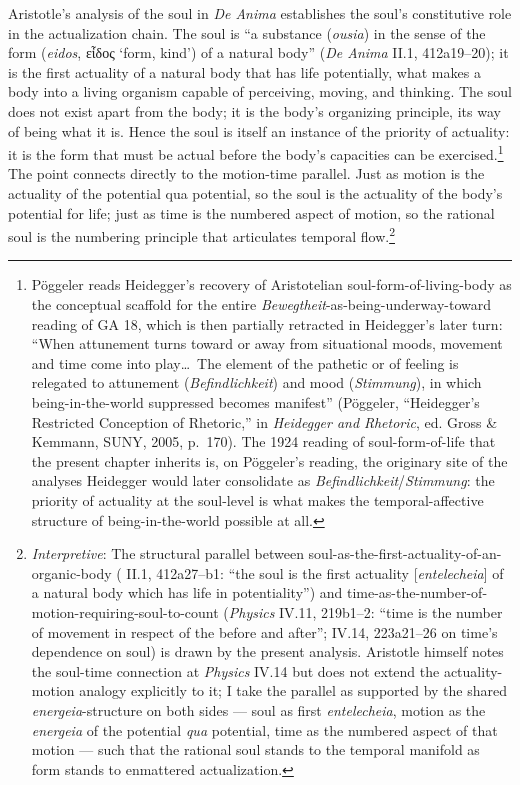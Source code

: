 \documentclass{article}
\newcommand{\gk}[1]{{\greekfont #1}}
\begin{document}
Aristotle's analysis of the soul in \textit{De Anima} establishes the soul's constitutive role in the actualization chain. The soul is ``a substance (\textit{ousia}) in the sense of the form (\textit{eidos}, \gk{εἶδος} `form, kind') of a natural body'' (\textit{De Anima} II.1, 412a19--20); it is the first actuality of a natural body that has life potentially, what makes a body into a living organism capable of perceiving, moving, and thinking. The soul does not exist apart from the body; it is the body's organizing principle, its way of being what it is. Hence the soul is itself an instance of the priority of actuality: it is the form that must be actual before the body's capacities can be exercised.\footnote{Pöggeler reads Heidegger's recovery of Aristotelian soul-form-of-living-body as the conceptual scaffold for the entire \textit{Bewegtheit}-as-being-underway-toward reading of GA 18, which is then partially retracted in Heidegger's later turn: ``When attunement turns toward or away from situational moods, movement and time come into play\ldots\ The element of the pathetic or of feeling is relegated to attunement (\textit{Befindlichkeit}) and mood (\textit{Stimmung}), in which being-in-the-world suppressed becomes manifest'' (Pöggeler, ``Heidegger's Restricted Conception of Rhetoric,'' in \textit{Heidegger and Rhetoric}, ed. Gross \& Kemmann, SUNY, 2005, p.~170). The 1924 reading of soul-form-of-life that the present chapter inherits is, on Pöggeler's reading, the originary site of the analyses Heidegger would later consolidate as \textit{Befindlichkeit}/\textit{Stimmung}: the priority of actuality at the soul-level is what makes the temporal-affective structure of being-in-the-world possible at all.} The point connects directly to the motion-time parallel. Just as motion is the actuality of the potential qua potential, so the soul is the actuality of the body's potential for life; just as time is the numbered aspect of motion, so the rational soul is the numbering principle that articulates temporal flow.\footnote{\textit{Interpretive}: The structural parallel between soul-as-the-first-actuality-of-an-organic-body (\cite{aristotle2014soul} II.1, 412a27--b1: ``the soul is the first actuality [\textit{entelecheia}] of a natural body which has life in potentiality'') and time-as-the-number-of-motion-requiring-soul-to-count (\textit{Physics} IV.11, 219b1--2: ``time is the number of movement in respect of the before and after''; IV.14, 223a21--26 on time's dependence on soul) is drawn by the present analysis. Aristotle himself notes the soul-time connection at \textit{Physics} IV.14 but does not extend the actuality-motion analogy explicitly to it; I take the parallel as supported by the shared \textit{energeia}-structure on both sides --- soul as first \textit{entelecheia}, motion as the \textit{energeia} of the potential \textit{qua} potential, time as the numbered aspect of that motion --- such that the rational soul stands to the temporal manifold as form stands to enmattered actualization.}
\end{document}
